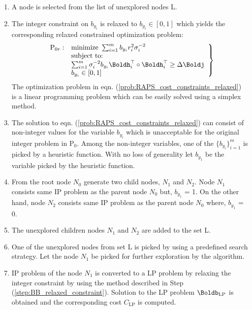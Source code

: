 \begin{enumerate}
	\item A node is selected from the list of unexplored nodes L.
	\item \label{step:BB_relaxed_constraint} The integer constraint on $b_{y_i}$ is relaxed to $b_{y_i} \in [0,1]$ which yields the corresponding relaxed constrained optimization problem:	
	\begin{align} \label{prob:RAPS_cost_constraints_relaxed}
		\left.
		\begin{array}{rl}
			\text{P}_{0r}: &
			\text{minimize} ~ \sum_{i=1}^m b_{y_i} r^2_i \sigma^{-2}_i \\ 
			& \text{subject to:} \\
			& \sum_{i=1}^m \sigma_i^{-2} b_{y_i} 
			\Boldh_i^\top \circ \Boldh_i^\top \ge \Delta \Boldj \\
			& b_{y_i} \in [0,1]
		\end{array}
		\right\}
	\end{align}
	The optimization problem in eqn. (\ref{prob:RAPS_cost_constraints_relaxed}) is a linear programming problem which can be easily solved using a simplex method.
	
	\item \label{step:BB_branching} The solution to eqn. (\ref{prob:RAPS_cost_constraints_relaxed}) can consist of non-integer values for the variable $b_{y_i}$ which is unacceptable for the original integer problem in P$_0$. Among the non-integer variables, one of the $\{b_{y_i}\}_{i=1}^m$ is picked by a heuristic function. With  no loss of generality let $b_{y_1}$ be the variable picked by the heuristic function.
	\item From the root node $N_0$ generate two child nodes, $N_1$ and $N_2$. Node $N_1$ consists same IP problem as the parent node $N_0$ but, $b_{y_1}$ = 1. On the other hand, node $N_2$ consists same IP problem as the parent node $N_0$ where, $b_{y_1}$ = 0.
		
	\item The unexplored children nodes $N_1$ and $N_2$ are added to the set L.
	
	\item  One of the unexplored nodes from set L is picked by using a predefined search strategy. Let the node $N_1$ be picked for further exploration by the algorithm.
	
	\item IP problem of the node $N_1$ is converted to a LP problem by relaxing the integer constraint by using the method described in Step (\ref{step:BB_relaxed_constraint}). 
	Solution to the LP problem $\Boldb_{\text{LP}}$ is obtained and the corresponding cost $C_{\text{LP}}$ is computed.
\end{enumerate}

